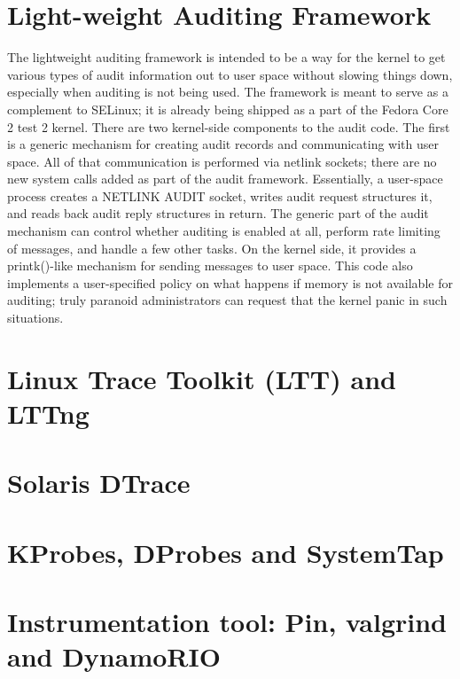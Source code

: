 \section{Light-weight Auditing Framework}

The lightweight auditing framework is intended to be a way for the kernel to
get various types of audit information out to user space without slowing things
down, especially when auditing is not being used. The framework is meant to
serve as a complement to SELinux; it is already being shipped as a part of the
Fedora Core 2 test 2 kernel. There are two kernel-side components to the audit
code. The first is a generic mechanism for creating audit records and
communicating with user space. All of that communication is performed via
netlink sockets; there are no new system calls added as part of the audit
framework. Essentially, a user-space process creates a NETLINK AUDIT socket,
writes audit request structures it, and reads back audit reply structures in
return. The generic part of the audit mechanism can control whether auditing is
enabled at all, perform rate limiting of messages, and handle a few other
tasks. On the kernel side, it provides a printk()-like mechanism for sending
messages to user space. This code also implements a user-specified policy on
what happens if memory is not available for auditing; truly paranoid
administrators can request that the kernel panic in such situations.

\section{Linux Trace Toolkit (LTT) and LTTng}

\section{Solaris DTrace}

\section{KProbes, DProbes and SystemTap}

\section{Instrumentation tool: Pin, valgrind and DynamoRIO}
